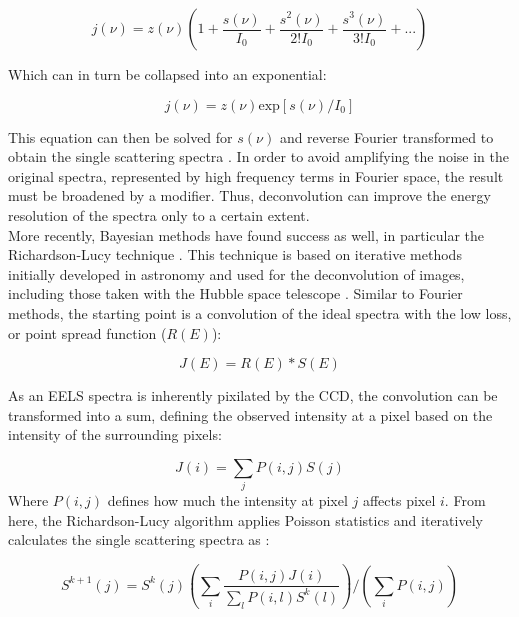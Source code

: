 \begin{equation}
	j(\nu) = z(\nu) \left(1+\frac{s(\nu)}{I_0}+   \frac{s^2(\nu)}{2! I_0}+ \frac{s^3(\nu)}{3! I_0} + ...\right)
	\label{fourier_spectra}
\end{equation} 

Which can in turn be collapsed into an exponential:

\begin{equation}
	j(\nu) = z(\nu)\mathrm{exp}[s(\nu)/I_0]
\end{equation}

This equation can then be solved for $s(\nu)$ and reverse Fourier transformed to obtain the single scattering spectra \cite{egerton_fourier_1985}.  In order to avoid amplifying the noise in the original spectra,  represented by high frequency terms in Fourier space, the result must be broadened by a modifier.  Thus, deconvolution can improve the energy resolution of the spectra only to a certain extent.  \\

More recently, Bayesian methods have found success as well, in particular the Richardson-Lucy technique \cite{richardson_lucy}. This technique is based on iterative methods initially developed in astronomy and used for the deconvolution of images, including those taken with the Hubble space telescope \cite{hubble}.  Similar to Fourier methods, the starting point is a convolution of the ideal spectra with the low loss, or point spread function ($R(E)$):

\begin{equation}
J(E) = R(E)\ast S(E)
\end{equation}

As an EELS spectra is inherently pixilated by the CCD, the convolution can be transformed into a sum, defining the observed intensity at a pixel based on the intensity of the surrounding pixels: 

\begin{equation}
	J(i) = \sum_{j} P(i,j) S(j)
\end{equation}
Where $P(i,j)$ defines how much the intensity at pixel $j$ affects pixel $i$.  
From here, the Richardson-Lucy algorithm applies Poisson statistics and iteratively calculates the single scattering spectra as  \cite{richardson_lucy}:  

\begin{equation}
S^{k+1}(j) = S^k(j) \left(\sum_{i} \frac{P(i,j)J(i)}{\sum_{l}P(i,l)S^k(l)}\right) \bigg/ \left( \sum_{i} P(i,j)\right)
\end{equation}

